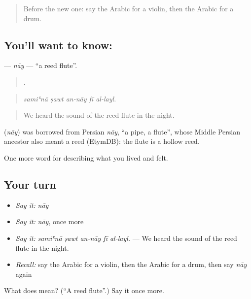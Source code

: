 \begin{quote}
Before the new one: say the Arabic for a violin, then the Arabic for a drum.
\end{quote}

\subsection*{You'll want to know: }
\textbf{} — \emph{nāy} — \textquotedblleft{}a reed flute\textquotedblright{}.

\begin{quote}
    .
\end{quote}

\begin{quote}
\emph{samiʿnā ṣawt an-nāy fī al-layl.}
\end{quote}

\begin{quote}
We heard the sound of the reed flute in the night.
\end{quote}

\begin{cousinweb}
\textbf{} (\emph{nāy}) was borrowed from Persian \emph{nāy}, \textquotedblleft{}a pipe, a flute\textquotedblright{}, whose Middle Persian ancestor also meant a reed (EtymDB): the flute is a hollow reed.
\end{cousinweb}

\begin{grammarlens}[title={What you've built}]
One more word for describing what you lived and felt.
\end{grammarlens}

\subsection*{Your turn}
\begin{itemize}
\raggedright
  \item \emph{Say it:} \emph{nāy}
  \item \emph{Say it:} \emph{nāy}, once more
  \item \emph{Say it:} \emph{samiʿnā ṣawt an-nāy fī al-layl.} — We heard the sound of the reed flute in the night.
  \item \emph{Recall:} say the Arabic for a violin, then the Arabic for a drum, then say \emph{nāy} again
\end{itemize}

\begin{tcolorbox}[breakable,colback=teal!4,colframe=teal!35!black,title={Before you move on}]
What does  mean? (\textquotedblleft{}A reed flute\textquotedblright{}.) Say it once more.
\end{tcolorbox}
